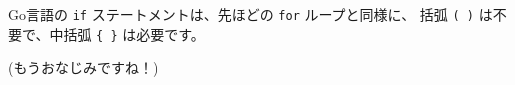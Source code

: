 Go言語の \texttt{if} ステートメントは、先ほどの \texttt{for} ループと同様に、
括弧 \texttt{( )} は不要で、中括弧 \texttt{\{ \}} は必要です。

(もうおなじみですね！)